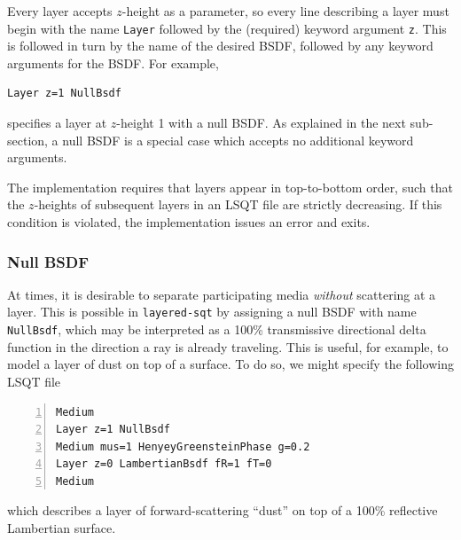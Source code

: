 \documentclass[
    twoside,
    twocolumn,
    letterpaper,
    10pt]{article}
\newcommand\namett[2]{{\color{code#1}\texttt{#2}}}
\begin{document}
Every layer accepts $z$-height as a parameter, so every line describing a 
layer must begin with the name \namett{blue}{Layer} followed by the (required)
keyword argument \texttt{z}. This is followed in turn by the name of the 
desired BSDF, followed by any keyword arguments for the BSDF. For example,
\begin{lstlisting}
Layer z=1 NullBsdf
\end{lstlisting}
specifies a layer at $z$-height 1 with a null BSDF. As explained in 
the next sub-section, a null BSDF is a special case which accepts no additional
keyword arguments.

The implementation requires that layers appear in top-to-bottom order,
such that the $z$-heights of subsequent layers in an LSQT file are
strictly decreasing. If this condition 
is violated, the implementation issues an error and exits.

\subsubsection{Null BSDF}
\label{sec:doc-layers-null}

At times, it is desirable to separate participating media 
\emph{without} scattering at a layer. This is possible in
\texttt{layered-sqt} by assigning a null BSDF with name 
\namett{purple}{NullBsdf}, which may be interpreted as a 100\% 
transmissive directional delta function in the direction a 
ray is already traveling. This is useful, for example, to model a 
layer of dust on top of a surface. To do so, we might specify the 
following LSQT file
\begin{lstlisting}[numbers=left]
Medium
Layer z=1 NullBsdf
Medium mus=1 HenyeyGreensteinPhase g=0.2
Layer z=0 LambertianBsdf fR=1 fT=0
Medium
\end{lstlisting}
which describes a layer of forward-scattering ``dust'' on top 
of a 100\% reflective Lambertian surface.
\end{document}
